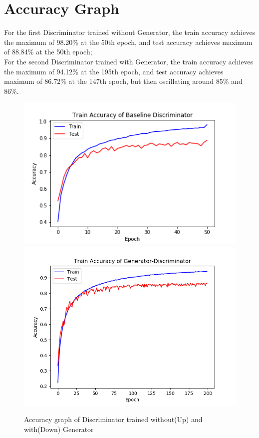 \documentclass[15pt]{article}
\begin{document}
\section{Accuracy Graph}
For the first Discriminator trained without Generator, the train accuracy achieves the maximum of 98.20\% at the 50th epoch, and test accuracy achieves maximum of 88.84\% at the 50th epoch;\\
For the second Discriminator trained with Generator, the train accuracy achieves the maximum of 94.12\% at the 195th epoch, and test accuracy achieves maximum of 86.72\% at the 147th epoch, but then oscillating around 85\% and 86\%.
\begin{figure}
\centering
\includegraphics[width=\textwidth]{../Baseline_Accuracy_Plot}
\includegraphics[width=\textwidth]{../Gen_Disc_Accuracy_Plot}
\caption{Accuracy graph of Discriminator trained without(Up) and with(Down) Generator}
\end{figure}
\end{document}
